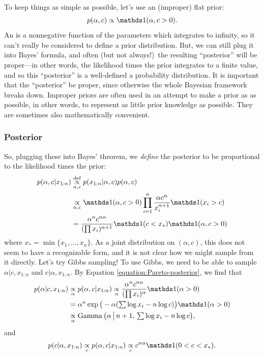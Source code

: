 \documentclass[12pt]{article}
\begin{document}
To keep things as simple as possible, let's use an (improper) flat prior:
$$p(\alpha,c) \propto \I(\alpha,c>0).$$
An  is a nonnegative function of the parameters which integrates to infinity, so it can't really be considered to define a prior distribution. But, we can still plug it into Bayes' formula, and often (but not always!)\ the resulting ``posterior'' will be proper---in other words, the likelihood times the prior integrates to a finite value, and so this ``posterior'' is a well-defined a probability distribution. It is important that the ``posterior'' be proper, since otherwise the whole Bayesian framework breaks down. Improper priors are often used in an attempt to make a prior as  as possible, in other words, to represent as little prior knowledge as possible. They are sometimes also mathematically convenient.

\subsubsection{Posterior}
So, plugging these into Bayes' theorem, we \textit{define} the posterior to be proportional to the likelihood times the prior:
\begin{align}
    p(\alpha,c|x_{1:n}) & \overset{\text{def}}{\underset{\alpha,c}{\propto}} p(x_{1:n}|\alpha,c)p(\alpha,c)\notag\\ 
    &\underset{\alpha,c}{\propto}\I(\alpha,c>0)\prod_{i=1}^n \frac{\alpha c^\alpha}{x_i^{\alpha+1}}\I(x_i>c) \notag\\
    & = \frac{\alpha^n c^{n\alpha}}{(\prod x_i)^{\alpha+1}} \I(c<x_*)\I(\alpha,c>0)\label{equation:Pareto-posterior}
\end{align}
where $x_* = \min\{x_1,\ldots,x_n\}$. As a joint distribution on $(\alpha,c)$, this does not seem to have a recognizable form, and it is not clear how we might sample from it directly. Let's try Gibbs sampling! To use Gibbs, we need to be able to sample $\alpha|c,x_{1:n}$ and $c|\alpha,x_{1:n}$. By Equation \ref{equation:Pareto-posterior}, we find that
\begin{align*}
p(\alpha|c,x_{1:n})&\underset{\alpha}{\propto}p(\alpha,c|x_{1:n})
\underset{\alpha}{\propto} \frac{\alpha^n c^{n\alpha}}{(\prod x_i)^\alpha}\I(\alpha>0) \\
&= \alpha^n\exp\big(-\alpha(\textstyle\sum\log x_i - n\log c)\big)\I(\alpha>0) \\
&\underset{\alpha}{\propto} \Ga\big(\alpha\,\big\vert\, n+1,\,\textstyle\sum\log x_i - n\log c\big),
\end{align*}
and
\begin{align*}
p(c|\alpha, x_{1:n})\underset{c}{\propto}p(\alpha,c|x_{1:n})
\underset{c}{\propto} c^{n\alpha}\I(0<c<x_*).
\end{align*}
\end{document}
